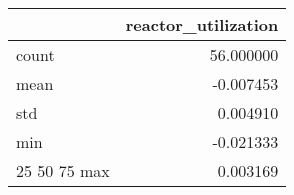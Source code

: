 \begin{tabular}{lr}
\toprule
 & reactor\_utilization \\
\midrule
count & 56.000000 \\
mean & -0.007453 \\
std & 0.004910 \\
min & -0.021333 \\
25%
50%
75%
max & 0.003169 \\
\bottomrule
\end{tabular}

